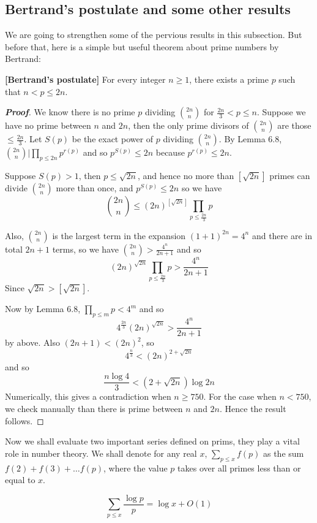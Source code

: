 \subsection{Bertrand's postulate and some other results}
We are going to strengthen some of the pervious results in this subsection. But before that, here is
a simple but useful theorem about prime numbers by Bertrand:
\begin{theorem}{\bf [Bertrand's postulate]}\label{B;Bertrand} For every integer $n \ge 1$, there exists
a prime $p$ such that $n < p \le 2n$.
\end{theorem}
\begin{proof}[\bf Proof] We know there is no prime $p$ dividing $\binom{2n}{n}$ for $\frac{2n}{3} <p \le n$.
Suppose we have no prime between $n$ and $2n$,
then the only prime divisors of $\binom{2n}{n}$ are those $\le \frac{2n}{3}$.
Let $S(p)$ be the exact power of $p$ dividing $\binom{2n}{n}$.
By Lemma 6.8, $\binom{2n}{n} \big| \prod_{p \le 2n}p^{r(p)}$ and so $p^{S(p)} \le 2n$ because
$p^{r(p)} \le 2n$.

Suppose $S(p)>1$, then $p \le \sqrt{2n}$, and hence no more than $[\sqrt{2n}]$ primes can divide
$\binom{2n}{n}$ more than once, and $p^{S(p)} \le 2n$ so we have
$$\binom{2n}{n} \le \left(2n\right)^{[\sqrt{2n}]}\prod_{p \le \frac{2n}{3}}p$$

Also, $\binom{2n}{n}$ is the largest term in the expansion $(1+1)^{2n}=4^n$ and there are in total
$2n+1$ terms, so we have $\binom{2n}{n} >\frac{4^n}{2n+1}$ and so
$$(2n)^{\sqrt{2n}} \prod_{p \le \frac{2n}{3}}p > \frac{4^n}{2n+1}$$
Since $\sqrt{2n}>[\sqrt{2n}]$.

Now by Lemma 6.8, $\prod_{p \le m}p <4^m$ and so
$$4^{\frac{2n}{3}}\left(2n\right)^{\sqrt{2n}}>\frac{4^n}{2n+1}$$ by above. Also $(2n+1)<(2n)^2$,
so $$4^{\frac{n}{3}}<\left(2n\right)^{2+\sqrt{2n}}$$
and so
$$\frac{n\log{4}}{3}<\left(2+\sqrt{2n}\right)\log{2n}$$
Numerically, this gives a contradiction when
$n \ge 750$. For the case when $n<750$, we check manually than there is prime
between $n$ and $2n$. Hence the result follows.
\end{proof}
Now we shall evaluate two important series defined on prims, they play a vital role in number theory.
We shall denote for any real $x$, $\sum_{p \le x}f(p)$ as the sum $f(2)+f(3)+\ldots f(p)$, where the
value $p$ takes over all primes less than or equal to $x$.
\begin{theorem}
$$\sum_{p \le x} \frac{\log{p}}{p}=\log{x}+O(1)$$
\end{theorem}
